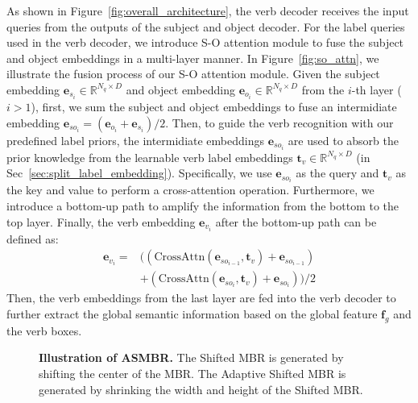 \documentclass[10pt,twocolumn,letterpaper]{article}
\begin{document}
\quad As shown in Figure~\ref{fig:overall_architecture}, the verb decoder receives the input queries from the outputs of the subject and object decoder.
For the label queries used in the verb decoder, we introduce S-O attention module to fuse the subject and object embeddings in a multi-layer manner.
In Figure~\ref{fig:so_attn}, we illustrate the fusion process of our S-O attention module.
Given the subject embedding $\bm{e}_{s_i}\in\mathbb{R}^{N_q\times D}$ and object embedding $\bm{e}_{o_i}\in\mathbb{R}^{N_q\times D}$ from the $i$-th layer ($i>1$), first, we sum the subject and object embeddings to fuse an intermidiate embedding $\bm{e}_{so_i}=(\bm{e}_{o_i}+\bm{e}_{s_i})/2$.
Then, to guide the verb recognition with our predefined label priors, the intermidiate embeddings $\bm{e}_{so_i}$ are used to absorb the prior knowledge from the learnable verb label embeddings $\bm{t}_{v}\in\mathbb{R}^{N_q\times D}$ (in Sec~\ref{sec:split_label_embedding}).
Specifically, we use $\bm{e}_{so_i}$ as the query and $\bm{t}_{v}$ as the key and value to perform a cross-attention operation.
Furthermore, we introduce a bottom-up path to amplify the information from the bottom to the top layer.
Finally, the verb embedding $\bm{e}_{v_i}$ after the bottom-up path can be defined as:
\begin{equation}
  \begin{split}
      \bm{e}_{v_i} = &  ( (\text{CrossAttn}(\bm{e}_{so_{i-1}}, \bm{t}_{v}) + \bm{e}_{so_{i-1}} ) \\
                     & + ( \text{CrossAttn}(\bm{e}_{so_{i}}, \bm{t}_{v}) + \bm{e}_{so_{i}} )  ) /2
  \end{split}
\end{equation}
Then, the verb embeddings from the last layer are fed into the verb decoder to further extract the global semantic information based on the global feature $\bm{f}_g$ and the verb boxes.

\begin{figure}[t]
    \centering
    \caption{
        \textbf{Illustration of ASMBR.} The Shifted MBR is generated by shifting the center of the MBR.
        The Adaptive Shifted MBR is generated by shrinking the width and height of the Shifted MBR.
    }
    \label{fig:asmbr}
\end{figure}
\end{document}
